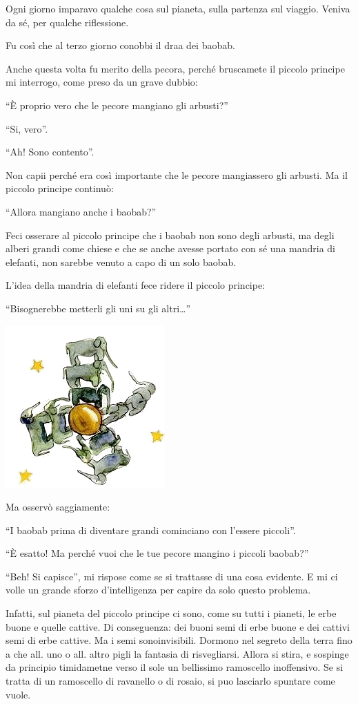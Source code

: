 \documentclass[11pt]{scrbook}
\begin{document}
Ogni giorno imparavo qualche cosa sul pianeta, sulla partenza sul
viaggio. Veniva da sé, per qualche riflessione.

Fu così che al terzo giorno conobbi il draa dei baobab.

Anche questa volta fu merito della pecora, perché bruscamete il piccolo
principe mi interrogo, come preso da un grave dubbio:

``È proprio vero che le pecore mangiano gli arbusti?''

``Si, vero''.

``Ah! Sono contento''.

Non capii perché era così importante che le pecore mangiassero gli
arbusti. Ma il piccolo principe continuò:

``Allora mangiano anche i baobab?''

Feci osserare al piccolo principe che i baobab non sono degli arbusti,
ma degli alberi grandi come chiese e che se anche avesse portato con sé
una mandria di elefanti, non sarebbe venuto a capo di un solo baobab.

L'idea della mandria di elefanti fece ridere il piccolo principe:

``Bisognerebbe metterli gli uni su gli altri\ldots{}''

\begin{center}
\includegraphics{img/5a}
\end{center}

Ma osservò saggiamente:

``I baobab prima di diventare grandi cominciano con l'essere piccoli''.

``È esatto! Ma perché vuoi che le tue pecore mangino i piccoli baobab?''

``Beh! Si capisce'', mi rispose come se si trattasse di una cosa
evidente. E mi ci volle un grande sforzo d'intelligenza per capire da
solo questo problema.

Infatti, sul pianeta del piccolo principe ci sono, come su tutti i
pianeti, le erbe buone e quelle cattive. Di conseguenza: dei buoni semi
di erbe buone e dei cattivi semi di erbe cattive. Ma i semi
sonoinvisibili. Dormono nel segreto della terra fino a che all. uno o
all. altro pigli la fantasia di risvegliarsi. Allora si stira, e
sospinge da principio timidametne verso il sole un bellissimo ramoscello
inoffensivo. Se si tratta di un ramoscello di ravanello o di rosaio, si
puo lasciarlo spuntare come vuole.
\end{document}
